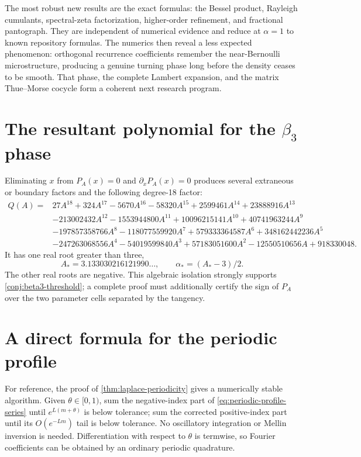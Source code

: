 \documentclass[11pt]{article}
\theoremstyle{definition}
\theoremstyle{remark}
\begin{document}
The most robust new results are the exact formulas: the Bessel product,
Rayleigh cumulants, spectral-zeta factorization, higher-order refinement, and
fractional pantograph.  They are independent of numerical evidence and reduce
at \(\alpha=1\) to known repository formulas.  The numerics then reveal a
less expected phenomenon: orthogonal recurrence coefficients remember the
near-Bernoulli microstructure, producing a genuine turning phase long before
the density ceases to be smooth.  That phase, the complete Lambert expansion,
and the matrix Thue--Morse cocycle form a coherent next research program.

\appendix

\section{The resultant polynomial for the \(\beta_3\) phase}
\label{app:beta3-polynomial}

Eliminating \(x\) from \(P_A(x)=0\) and \(\partial_xP_A(x)=0\) produces several
extraneous or boundary factors and the following degree-18 factor:
\begin{align*}
 Q(A)={}&27A^{18}+324A^{17}-5670A^{16}-58320A^{15}
 +2599461A^{14}+23888916A^{13}\\
 &-213002432A^{12}-1553944800A^{11}+10096215141A^{10}
 +40741963244A^9\\
 &-197857358766A^8-118077559920A^7+579333364587A^6
 +348162442236A^5\\
 &-247263068556A^4-54019599840A^3+57183051600A^2
 -12550510656A+918330048.
\end{align*}
It has one real root greater than three,
\[
 A_*=3.133030216121990\ldots,
 \qquad \alpha_*=(A_*-3)/2.
\]
The other real roots are negative.  This algebraic isolation strongly
supports \cref{conj:beta3-threshold}; a complete proof must additionally
certify the sign of \(P_A\) over the two parameter cells separated by the
tangency.

\section{A direct formula for the periodic profile}

For reference, the proof of \cref{thm:laplace-periodicity} gives a numerically
stable algorithm.  Given \(\theta\in[0,1)\), sum the negative-index part of
\eqref{eq:periodic-profile-series} until
\(e^{L(m+\theta)}\) is below tolerance; sum the corrected positive-index part
until its \(O(e^{-Lm})\) tail is below tolerance.  No oscillatory integration
or Mellin inversion is needed.  Differentiation with respect to \(\theta\)
is termwise, so Fourier coefficients can be obtained by an ordinary periodic
quadrature.
\end{document}
